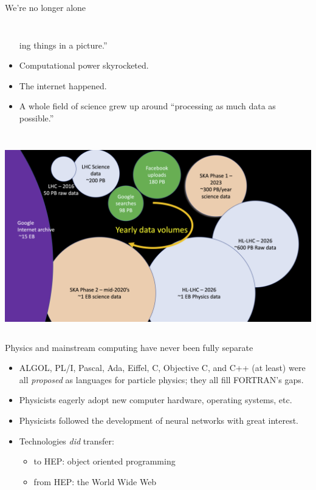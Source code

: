 \documentclass[aspectratio=169]{beamer}
\begin{document}
\begin{frame}{We're no longer alone}
\begin{columns}[t]
\begin{itemize}
ing things in a picture.''

\item<8-> Computational power skyrocketed.

\item<9-> The internet happened.

\item<10-> A whole field of science grew up around ``processing as much data as possible.''
\end{itemize}

\end{columns}
\end{frame}

\begin{frame}{}
\vspace{-0.1 cm}
\begin{columns}
\includegraphics[width=\linewidth]{PLOTS/data-volumes.png}
\end{columns}
\end{frame}

\begin{frame}{Physics and mainstream computing have never been fully separate}
\large
\vspace{0.5 cm}
\begin{itemize}\setlength{\itemsep}{0.75 cm}
\item ALGOL, PL/I, Pascal, Ada, Eiffel, C, Objective C, and C++ (at least) were all {\it proposed} as languages for particle physics; they all fill FORTRAN's gaps.

\item<2-> Physicists eagerly adopt new computer hardware, operating systems, etc.

\item<3-> Physicists followed the development of neural networks with great interest.

\item<4-> Technologies {\it did} transfer:

\vspace{0.25 cm}
\begin{itemize}\setlength{\itemsep}{0.25 cm}
\item to HEP: object oriented programming

\item from HEP: the World Wide Web
\end{itemize}
\end{itemize}
\end{frame}
\end{document}
